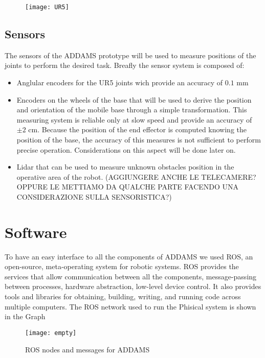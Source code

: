 \begin{figure}[htbp]
	\begin{center} 
		\texttt{[image: UR5]}
		\centering
		\label{fig:UR5} 
	\end{center}
\end{figure}


\subsection{Sensors}

The sensors of the ADDAMS prototype will be used to measure positions of the joints to perform the desired task. Breafly the sensor system is composed of:
\begin{itemize}
	\item Anglular encoders for the UR5 joints wich provide an accuracy of $0.1$ mm
	\item Encoders on the wheels of the base that will be used to derive the position and orientation of the mobile base through a simple transformation. This measuring system is reliable only at slow speed and provide an accuracy of $\pm 2$ cm. Because the position of the end effector is computed knowing the position of the base, the accuracy of this measures is not sufficient to perform precise operation. Considerations on this aspect will be done later on.
	\item Lidar that can be used to measure unknown obstacles position in the operative area of the robot.
	(AGGIUNGERE ANCHE LE TELECAMERE? OPPURE LE METTIAMO DA QUALCHE PARTE FACENDO UNA CONSIDERAZIONE SULLA SENSORISTICA?)
\end{itemize}

\section{Software}

To have an easy interface to all the components of ADDAMS we used ROS, an open-source, meta-operating system for robotic systems. ROS provides the services that allow communication between all the components, message-passing between processes, hardware abstraction, low-level device control. It also provides tools and libraries for obtaining, building, writing, and running code across multiple computers. The ROS network used to run the Phisical system is shown in the Graph

\begin{figure}[htbp]
	\begin{center} 
		\texttt{[image: empty]}
		\centering
		\label{ROSnodes} 
		\caption{ROS nodes and messages for ADDAMS}
	\end{center}
\end{figure}

